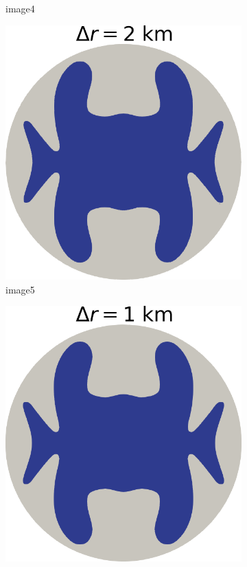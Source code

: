 \documentclass{article}
\begin{document}
\begin{figure}[!h]
\begin{minipage}[t]{.25\textwidth}
\begin{subfigure}{\textwidth}
			\caption{image4}
			\label{fig:4}
		\end{subfigure}\hfil %
		\begin{subfigure}{\textwidth}
			\includegraphics[width=\linewidth]{../fig/Grounded_zone_2km.png}
			\caption{image5}
			\label{fig:5}
		\end{subfigure}\hfil %
		\begin{subfigure}{\textwidth}
			\includegraphics[width=\linewidth]{../fig/Grounded_zone_1km.png}

\end{subfigure}
\end{minipage}
\end{figure}
\end{document}
